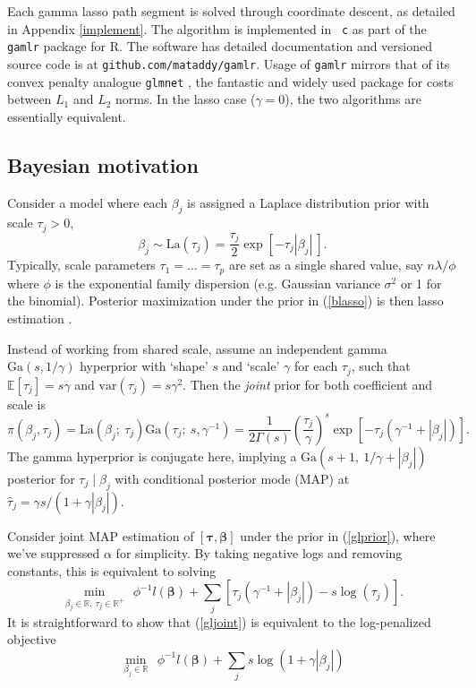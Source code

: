 \documentclass[12pt]{article}
\newcommand{\bs}[1]{\boldsymbol{#1}}
\newcommand{\mr}[1]{\mathrm{#1}}
\newcommand{\ds}[1]{\mathds{#1}}
\begin{document}
Each  gamma lasso path segment is solved through coordinate descent,
as detailed in Appendix \ref{implement}.  The algorithm is implemented in {\tt
c} as part of the {\tt gamlr} package for {\sf R}. The software  has detailed documentation and versioned source code is at
{\tt github.com/mataddy/gamlr}.  Usage of {\tt gamlr} mirrors that of its
convex penalty analogue {\tt glmnet} \citep{friedman_regularization_2010}, the
fantastic and widely used package for costs between $L_1$ and $L_2$ norms. In
the lasso case ($\gamma=0$), the two algorithms are essentially equivalent.


\subsection{Bayesian motivation}

Consider a model where each $\beta_j$ is
assigned a Laplace distribution prior with scale $\tau_j>0$,
\begin{equation}\label{blasso}
\beta_j \sim \mr{La}\left(\tau_j\right) =
\frac{\tau_j}{2}\exp\left[ -\tau_j|\beta_j| ~\right].
\end{equation}
Typically, scale parameters $\tau_1 =
\ldots = \tau_p$ are set as a single shared value, say $n\lambda/\phi$ where
 $\phi$ is the exponential family dispersion (e.g. Gaussian variance
$\sigma^2$ or 1 for the binomial).   Posterior
maximization under the prior in (\ref{blasso}) is then lasso estimation \citep[e.g.,][]{park_bayesian_2008}.

Instead of working from shared scale, assume an independent gamma
$\mr{Ga}(s,1/\gamma)$ hyperprior with `shape' $s$ and `scale' $\gamma$ for
each $\tau_j$, such that $\ds{E}[\tau_j] = s\gamma$ and $\mr{var}(\tau_j) =
s\gamma^2$.  Then the {\it joint} prior for both coefficient and scale is
\begin{equation}\label{glprior}
\pi(\beta_j,\tau_j) = \mr{La}\left(\beta_j ;~ \tau_j\right)
\mr{Ga}\left(\tau_j;~ s,\gamma^{-1}\right) = \frac{ 1}{2\Gamma({s})} 
\left(\frac{\tau_j}{\gamma}\right)^{s}
               \exp\left[-\tau_j(\gamma^{-1}+|\beta_j|)\right].
\end{equation}
The gamma hyperprior is conjugate here, implying a $\mr{Ga}\left(s+1, ~1/\gamma +
|\beta_j|\right)$ posterior for $\tau_j \mid \beta_j$ with conditional
posterior mode (MAP) at $\hat\tau_j = \gamma s/(1 + \gamma |\beta_j|)$.

Consider joint MAP estimation of $[\bs{\tau},\bs{\beta}]$ under the prior in
   (\ref{glprior}), where we've suppressed $\alpha$ for simplicity. By taking
   negative logs and removing constants, this is equivalent to solving
\begin{equation}\label{gljoint}
\min_{\beta_j\in\ds{R},~\tau_j \in \ds{R}^{+}}~~
\phi^{-1}l(\bs{\beta}) + \sum_j \left[\tau_j(\gamma^{-1}+|\beta_j|) - s\log(\tau_j)\right].
\end{equation}
It is straightforward to show that (\ref{gljoint}) is equivalent 
to the log-penalized objective 
\begin{equation}\label{logobj}
\min_{\beta_j\in\ds{R}}~~
\phi^{-1}l(\bs{\beta}) + \sum_j  s\log(1+\gamma|\beta_j|)
\end{equation}
\end{document}
